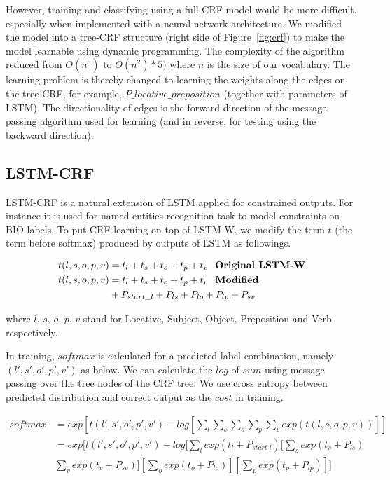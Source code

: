 \documentclass{esann}
\begin{document}
However, training and classifying using a full CRF model would be more difficult, especially when implemented  with a neural network architecture.  We modified the model into a tree-CRF structure (right side of Figure~\ref{fig:crf}) to make the model learnable using dynamic programming. The complexity of the algorithm reduced from $O(n^5)$ to $O(n^2) * 5)$ where $n$ is the size of our vocabulary. The learning problem is thereby changed to learning the weights along the edges on the tree-CRF, for example, $P\_locative\_preposition$ (together with parameters of LSTM). The directionality of edges is the forward direction of the message passing algorithm used for learning (and in reverse, for testing using the backward direction).

\subsection{LSTM-CRF}

LSTM-CRF is a natural extension of LSTM applied for constrained outputs. For instance it is used for named entities recognition task to model constraints on BIO labels\cite{huang2015bidirectional}. To put CRF learning on top of LSTM-W, we modify the term $t$ (the term before softmax) produced by outputs of LSTM as followings.

\begin{align*}
t(l,s,o,p,v) &= t_l + t_s + t_o + t_p + t_v \text{\vspace{20mm} \textbf{     Original LSTM-W}} \\
t(l,s,o,p,v) &= t_l + t_s + t_o + t_p + t_v \text{\vspace{20mm} \textbf{     Modified}}\\
&+ P_{start\_l} + P_{ls} + P_{lo} + P_{lp} + P_{sv}
\end{align*}

\noindent where $l$, $s$, $o$, $p$, $v$ stand for Locative, Subject, Object, Preposition and Verb respectively. 

In training, $softmax$ is calculated for a predicted label combination, namely $(l', s', o', p', v')$ as below. We can calculate the $log$ of $sum$ using message passing over the tree nodes of the CRF tree. We use cross entropy between predicted distribution and correct output as the $cost$ in training.

\begin{align*}
softmax &= exp[ t (l',s',o',p',v') -  log [\sum_{l}\sum_{s}\sum_{o}\sum_{p}\sum_{v} exp(t (l,s,o,p,v)) ] ] \\
&=  exp[ t (l',s',o',p',v')
-  log [ \sum_{l} exp(t_l + P_{start\_l})
[\sum_{s} exp(t_s + P_{ls}) \\ 
& \sum_{v} exp(t_v + P_{sv})]
[\sum_{o} exp(t_o + P_{lo})] [\sum_{p} exp(t_p + P_{lp})]]
\end{align*}
\end{document}

